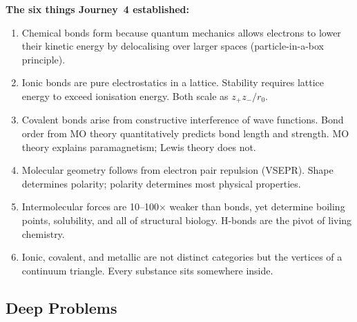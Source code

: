 \documentclass[12pt, a4paper]{book}
\begin{document}
\begin{synthbox}
\medskip
\textbf{The six things Journey~4 established:}
\begin{enumerate}[nosep, leftmargin=2em]
  \item Chemical bonds form because quantum mechanics allows
        electrons to lower their kinetic energy by delocalising
        over larger spaces (particle-in-a-box principle).
  \item Ionic bonds are pure electrostatics in a lattice.
        Stability requires lattice energy to exceed ionisation
        energy. Both scale as $z_+z_-/r_0$.
  \item Covalent bonds arise from constructive interference
        of wave functions. Bond order from MO theory
        quantitatively predicts bond length and strength.
        MO theory explains  paramagnetism; Lewis theory does not.
  \item Molecular geometry follows from electron pair repulsion
        (VSEPR). Shape determines polarity; polarity determines
        most physical properties.
  \item Intermolecular forces are 10--100$\times$ weaker than
        bonds, yet determine boiling points, solubility, and
        all of structural biology.
        H-bonds are the pivot of living chemistry.
  \item Ionic, covalent, and metallic are not distinct categories
        but the vertices of a continuum triangle.
        Every substance sits somewhere inside.
\end{enumerate}
\end{synthbox}

\subsection*{Deep Problems}
\end{document}
